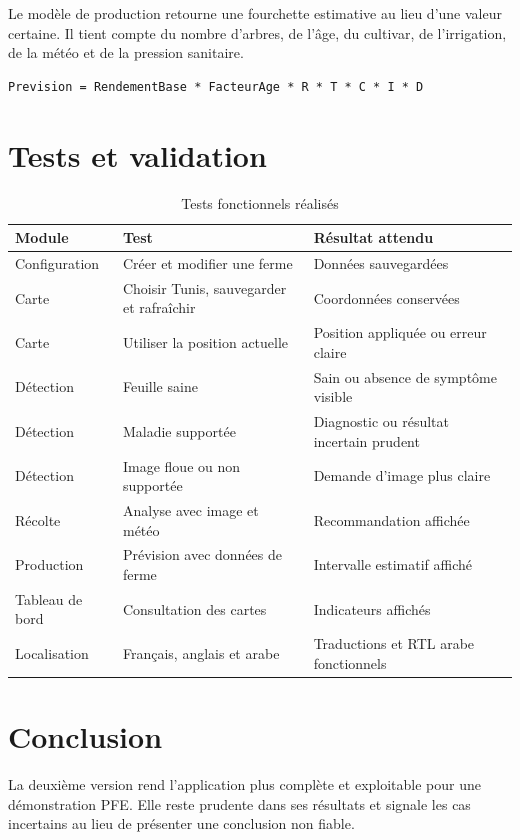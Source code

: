 \documentclass[12pt,a4paper]{report}
\begin{document}
Le modèle de production retourne une fourchette estimative au lieu d'une valeur certaine. Il tient compte du nombre d'arbres, de l'âge, du cultivar, de l'irrigation, de la météo et de la pression sanitaire.

\begin{verbatim}
Prevision = RendementBase * FacteurAge * R * T * C * I * D
\end{verbatim}

\section{Tests et validation}
\begin{table}[H]
\centering
\caption{Tests fonctionnels réalisés}
\label{tab:tests}
\small
\begin{tabular}{|p{3.8cm}|p{5.8cm}|p{3.5cm}|}
\hline
\textbf{Module} & \textbf{Test} & \textbf{Résultat attendu} \\
\hline
Configuration & Créer et modifier une ferme & Données sauvegardées \\
\hline
Carte & Choisir Tunis, sauvegarder et rafraîchir & Coordonnées conservées \\
\hline
Carte & Utiliser la position actuelle & Position appliquée ou erreur claire \\
\hline
Détection & Feuille saine & Sain ou absence de symptôme visible \\
\hline
Détection & Maladie supportée & Diagnostic ou résultat incertain prudent \\
\hline
Détection & Image floue ou non supportée & Demande d'image plus claire \\
\hline
Récolte & Analyse avec image et météo & Recommandation affichée \\
\hline
Production & Prévision avec données de ferme & Intervalle estimatif affiché \\
\hline
Tableau de bord & Consultation des cartes & Indicateurs affichés \\
\hline
Localisation & Français, anglais et arabe & Traductions et RTL arabe fonctionnels \\
\hline
\end{tabular}
\end{table}

\section{Conclusion}
La deuxième version rend l'application plus complète et exploitable pour une démonstration PFE. Elle reste prudente dans ses résultats et signale les cas incertains au lieu de présenter une conclusion non fiable.
\end{document}
